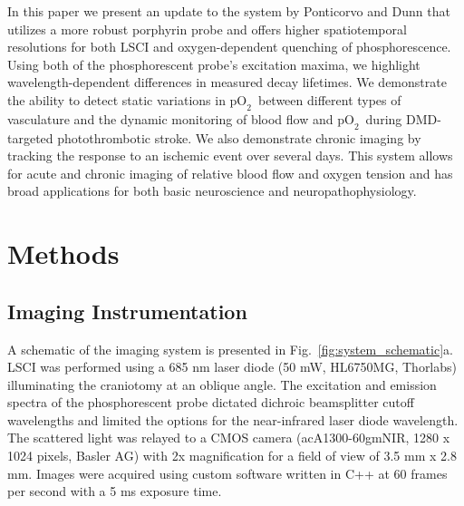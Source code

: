 \documentclass[12pt]{spieman}  %
\newcommand{\pO}{\ensuremath{\text{pO}_2}}
\begin{document}
\begin{spacing}{2}
In this paper we present an update to the system by Ponticorvo and Dunn \cite{Ponticorvo:2010uv} that utilizes a more robust porphyrin probe \cite{Esipova:2011hi} and offers higher spatiotemporal resolutions for both LSCI and oxygen-dependent quenching of phosphorescence. Using both of the phosphorescent probe's excitation maxima, we highlight wavelength-dependent differences in measured decay lifetimes. We demonstrate the ability to detect static variations in \pO\ between different types of vasculature and the dynamic monitoring of blood flow and \pO\ during DMD-targeted photothrombotic stroke. We also demonstrate chronic imaging by tracking the response to an ischemic event over several days. This system allows for acute and chronic imaging of relative blood flow and oxygen tension and has broad applications for both basic neuroscience and neuropathophysiology.


\section{Methods}
\label{sect:methods}

\subsection{Imaging Instrumentation}
A schematic of the imaging system is presented in Fig.~\ref{fig:system_schematic}a. LSCI was performed using a 685 nm laser diode (50 mW, HL6750MG, Thorlabs) illuminating the craniotomy at an oblique angle. The excitation and emission spectra of the phosphorescent probe dictated dichroic beamsplitter cutoff wavelengths and limited the options for the near-infrared laser diode wavelength. The scattered light was relayed to a CMOS camera (acA1300-60gmNIR, 1280 x 1024 pixels, Basler AG) with 2x magnification for a field of view of 3.5 mm x 2.8 mm. Images were acquired using custom software written in C++ at 60 frames per second with a 5 ms exposure time.


\end{spacing}
\end{document}
